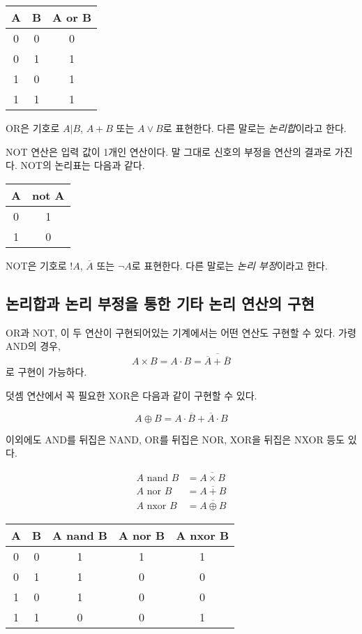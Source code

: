 \documentclass{article}
\begin{document}
\begin{center}
    \begin{tabular}{cc|c}
        A & B & A or B \\
        \hline
        0 & 0 & 0 \\
        0 & 1 & 1 \\
        1 & 0 & 1 \\
        1 & 1 & 1
    \end{tabular}
\end{center}

OR은 기호로 $A | B$, $A + B$ 또는 $A \vee B$로 표현한다. 다른 말로는
\textit{논리합}이라고 한다.

NOT 연산은 입력 값이 1개인 연산이다. 말 그대로 신호의 부정을 연산의 결과로 가진다.
NOT의 논리표는 다음과 같다.

\begin{center}
    \begin{tabular}{c|c}
        A & not A \\
        \hline
        0 & 1 \\
        1 & 0
    \end{tabular}
\end{center}

NOT은 기호로 $!A$, $\overline A$ 또는 $\neg A$로 표현한다. 다른 말로는
\textit{논리 부정}이라고 한다.

\subsection{논리합과 논리 부정을 통한 기타 논리 연산의 구현}

OR과 NOT, 이 두 연산이 구현되어있는 기계에서는 어떤 연산도 구현할 수 있다. 가령 AND의 경우,
$$A \times B = A \cdot B = \overline{\overline A + \overline B}$$
로 구현이 가능하다.

덧셈 연산에서 꼭 필요한 XOR은 다음과 같이 구현할 수 있다.

$$
A \oplus B = {A} \cdot \overline B + \overline A \cdot B
$$

이외에도 AND를 뒤집은 NAND, OR를 뒤집은 NOR, XOR을 뒤집은 NXOR 등도 있다.

$$
\begin{aligned}
    A \text{ nand } B &= \overline{A \times B} \\
    A \text{ nor } B &= \overline{A + B} \\
    A \text{ nxor } B &= \overline{A \oplus B}
\end{aligned}
$$

\begin{center}
    \begin{tabular}{cc|ccc}
        A & B & A nand B & A nor B & A nxor B \\
        \hline
        0 & 0 & 1 & 1 & 1 \\
        0 & 1 & 1 & 0 & 0 \\
        1 & 0 & 1 & 0 & 0 \\
        1 & 1 & 0 & 0 & 1
    \end{tabular}
\end{center}
\end{document}
